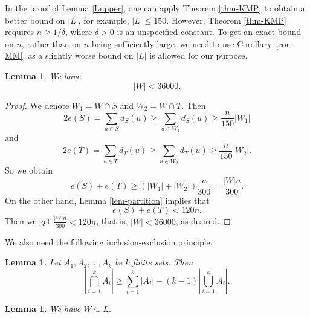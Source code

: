 \documentclass[11pt]{article}
\newtheorem{lemma}[theorem]{Lemma}
\begin{document}
 
   In the proof of Lemma \ref{Lupper}, one can apply  
 Theorem \ref{thm-KMP} to obtain a better bound on $|L|$, for example, $|L| \le 150$. However,  Theorem \ref{thm-KMP}  requires $n\ge 1/ \delta$, where $\delta >0$ is an unspecified constant. To get an exact bound on $n$, rather than on $n$ being sufficiently large, we need to use Corollary~\ref{cor-MM}, as a slightly worse bound on $|L|$ is allowed for our purpose.  
 

\begin{lemma}\label{W-Lenpty}
We have
$$|W| < 36000.$$
\end{lemma}


\begin{proof}
We denote $W_1=W\cap S$ and $W_2=W\cap T$. Then 
 $$2e(S) =\sum_{u\in S}d_{S}(u) \ge  \sum_{u\in W_1}d_S(u)\ge  \frac{n}{150} |W_1| $$ 
 and 
 \[  2e(T) = \sum_{u\in T}d_{T}(u)\ge  \sum_{u\in W_2}d_T(u)
 \ge \frac{n}{150} |W_2| . \]
  So we obtain 
  \begin{equation*} \label{WL-2}
  e(S)+e(T)\ge (|W_1|+|W_2|)\frac{ n}{300} 
  =\frac{|W|  n}{300}.
  \end{equation*}
 On the other hand, 
 Lemma \ref{lem-partition} implies that 
 \[  e(S)+e(T)< 120n. \] 
  Then we get $\frac{|W| n}{300}< 120n$, 
that is,
$ |W|< 36000$, as desired. 
  \end{proof}
  
  
  We also need the following  inclusion-exclusion principle.

\begin{lemma}\label{set}
Let $A_1, A_2,\dots, A_k$ be $k$  finite sets. Then
\begin{equation*}
\left| \bigcap_{i=1}^k A_i \right| \ge \sum_{i=1}^k |A_i|-(k-1)\left|\bigcup_{i=1}^k A_i\right|.
\end{equation*}
\end{lemma}

  
  \begin{lemma} \label{lem-W-sub-L}
  We have $W \subseteq L$. 
  \end{lemma}
  
\end{document}
